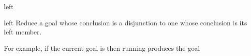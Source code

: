 \begin{tactic}{left}
  \begin{tsyntax}[empty]{left}
    Reduce a goal whose conclusion is a disjunction to one whose
    conclusion is its left member.

    For example, if the current goal is
     then
    running 
    produces the goal
  \end{tsyntax}
\end{tactic}
